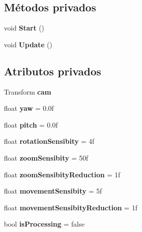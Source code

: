 \subsection*{Métodos privados}
\begin{DoxyCompactItemize}
\item 
\mbox{\label{class_camera_control_af93c098f6ebf3501a41912d88accc1f2}} 
void {\bfseries Start} ()
\item 
\mbox{\label{class_camera_control_ad597a309f58a7c0e2f7f8837a22f4707}} 
void {\bfseries Update} ()
\end{DoxyCompactItemize}
\subsection*{Atributos privados}
\begin{DoxyCompactItemize}
\item 
\mbox{\label{class_camera_control_ab1e38892e7de2594973a2689efe7d953}} 
Transform {\bfseries cam}
\item 
\mbox{\label{class_camera_control_aac049ab806525d07e5d8d6e58a319dfb}} 
float {\bfseries yaw} = 0.\+0f
\item 
\mbox{\label{class_camera_control_a2f6c91fee43b7225b4db9ac6ee2a5803}} 
float {\bfseries pitch} = 0.\+0f
\item 
\mbox{\label{class_camera_control_a83ed25c7aa137776336f286aa4ee720f}} 
float {\bfseries rotation\+Sensibity} = 4f
\item 
\mbox{\label{class_camera_control_a224cd9cb5169e365221e065ee024fa4c}} 
float {\bfseries zoom\+Sensibity} = 50f
\item 
\mbox{\label{class_camera_control_ae22afdbb7be97dc34dde89c14454fa49}} 
float {\bfseries zoom\+Sensibity\+Reduction} = 1f
\item 
\mbox{\label{class_camera_control_a01ac418e6b400af0cc99fa296cd11f65}} 
float {\bfseries movement\+Sensibity} = 5f
\item 
\mbox{\label{class_camera_control_aff6a3ff375bdfb784b890c1d3b88744e}} 
float {\bfseries movement\+Sensibity\+Reduction} = 1f
\item 
\mbox{\label{class_camera_control_aee9c2756bb3068ab9ddade8811ccf4fe}} 
bool {\bfseries is\+Processing} = false
\end{DoxyCompactItemize}


